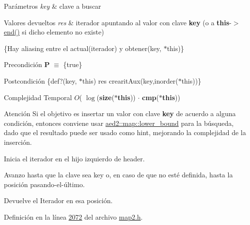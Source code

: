 \begin{DoxyParams}{\-Parámetros}
{\em key} & clave a buscar \\
\hline
\end{DoxyParams}

\begin{DoxyRetVals}{\-Valores devueltos}
{\em res} & iterador apuntando al valor con clave {\bfseries key} (o a {\bfseries this}-\/$>$\hyperlink{classaed2_1_1iterator_a67caf9468be999e9be96b7add5d79946_a67caf9468be999e9be96b7add5d79946}{end()} si dicho elemento no existe)\\
\hline
\end{DoxyRetVals}
\{\-Hay aliasing entre el actual(iterador) y obtener(key, $\ast$this)\}

\begin{DoxyPrecond}{\-Precondición}
{\bfseries \-P} $\equiv$ \{true\} 
\end{DoxyPrecond}
\begin{DoxyPostcond}{\-Postcondición}
\{def?(key, $\ast$this)  res  crearit\-Aux(key,inorder($\ast$this))\}
\end{DoxyPostcond}

\begin{DoxyDescription}
\item[\-Complejidad \-Temporal]$O$( $\log$({\bfseries size}({\bfseries $\ast$this})) $\cdot$ {\bfseries cmp}({\bfseries $\ast$this}))
\end{DoxyDescription}

\begin{DoxyAttention}{\-Atención}
\-Si el objetivo es insertar un valor con clave {\bfseries key} de acuerdo a alguna condición, entonces conviene usar \hyperlink{classaed2_1_1map_a3399d36fdd5a880b494f3a5795d3f18f_a3399d36fdd5a880b494f3a5795d3f18f}{aed2\-::map\-::lower\-\_\-bound} para la búsqueda, dado que el resultado puede ser usado como hint, mejorando la complejidad de la inserción.
\begin{DoxyItemize}
\item \-Inicia el iterador en el hijo izquierdo de header.
\item \-Avanzo hasta que la clave sea key o, en caso de que no esté definida, hasta la posición pasando-\/el-\/último.
\item \-Devuelve el \-Iterador en esa posición. 
\end{DoxyItemize}
\end{DoxyAttention}


\-Definición en la línea \hyperlink{map2_8h_source_l02072}{2072} del archivo \hyperlink{map2_8h_source}{map2.\-h}.

